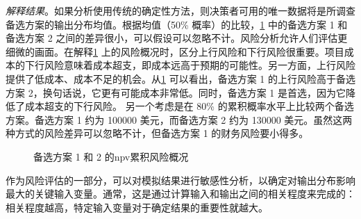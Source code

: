 \emph{解释结果}。如果分析使用传统的确定性方法，则决策者可用的唯一数据将是所调查备选方案的输出分布均值。根据均值（50\% 概率）的比较，\cref{fig:risk-profile} 中的备选方案 1 和备选方案 2 之间的差异很小，可以假设可以忽略不计。风险分析允许人们评估更细微的画面。在解释\cref{fig:risk-profile} 上的风险概况时，区分上行风险和下行风险很重要。项目成本的下行风险意味着成本超支，即成本远高于预期的可能性。另一方面，上行风险提供了低成本、成本不足的机会。从\cref{fig:risk-profile} 可以看出，备选方案 1 的上行风险高于备选方案 2，换句话说，它更有可能成本非常低。同时，备选方案 1 是首选，因为它降低了成本超支的下行风险。 另一个考虑是在 80\% 的累积概率水平上比较两个备选方案。备选方案 1 约为 \num{100000} 美元，而备选方案 2 约为 \num{130000} 美元。虽然这两种方式的风险差异可以忽略不计，但备选方案 1 的财务风险要小得多。

\begin{figure}
  \caption{备选方案 1 和 2 的\acrlong*{npv}累积风险概况}
  \label{fig:risk-profile}
\end{figure}

作为风险评估的一部分，可以对模拟结果进行敏感性分析，以确定对输出分布影响最大的关键输入变量。通常，这是通过计算输入和输出之间的相关程度来完成的：相关程度越高，特定输入变量对于确定结果的重要性就越大。

